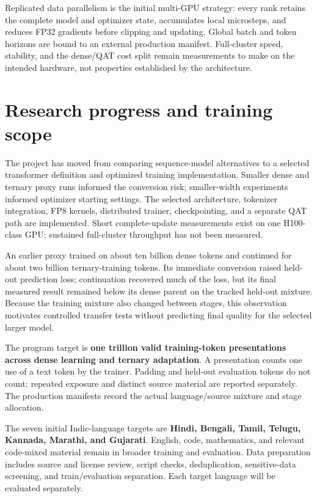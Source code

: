 \documentclass[11pt]{article}
\begin{document}
Replicated data parallelism is the initial multi-GPU strategy: every
rank retains the complete model and optimizer state, accumulates local
microsteps, and reduces FP32 gradients before clipping and updating.
Global batch and token horizons are bound to an external production
manifest. Full-cluster speed, stability, and the dense/QAT cost split
remain measurements to make on the intended hardware, not properties
established by the architecture.

\section{Research progress and training scope}

The project has moved from comparing sequence-model alternatives to a
selected transformer definition and optimized training implementation.
Smaller dense and ternary proxy runs informed the conversion risk;
smaller-width experiments informed optimizer starting settings. The
selected architecture, tokenizer integration, FP8 kernels, distributed
trainer, checkpointing, and a separate QAT path are implemented. Short
complete-update measurements exist on one H100-class GPU; sustained
full-cluster throughput has not been measured.

An earlier proxy trained on about ten billion dense tokens and continued
for about two billion ternary-training tokens. Its immediate conversion
raised held-out prediction loss; continuation recovered much of the loss,
but its final measured result remained below its dense parent on the
tracked held-out mixture. Because the training mixture also changed
between stages, this observation motivates controlled transfer tests
without predicting final quality for the selected larger model.

The program target is \textbf{one trillion valid training-token
presentations across dense learning and ternary adaptation}. A
presentation counts one use of a text token by the trainer. Padding and
held-out evaluation tokens do not count; repeated exposure and distinct
source material are reported separately. The production manifests record
the actual language/source mixture and stage allocation.

The seven initial Indic-language targets are \textbf{Hindi, Bengali,
Tamil, Telugu, Kannada, Marathi, and Gujarati}. English, code, mathematics,
and relevant code-mixed material remain in broader training and
evaluation. Data preparation includes source and license review, script
checks, deduplication, sensitive-data screening, and train/evaluation
separation. Each target language will be evaluated separately.
\end{document}
